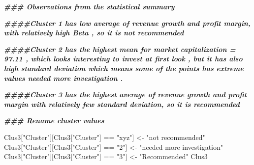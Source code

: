 \documentclass[
]{article}
\newenvironment{Shaded}{\begin{snugshade}}{\end{snugshade}}
\newcommand{\DocumentationTok}[1]{\textcolor[rgb]{0.56,0.35,0.01}{\textbf{\textit{#1}}}}
\newcommand{\NormalTok}[1]{#1}
\newcommand{\OtherTok}[1]{\textcolor[rgb]{0.56,0.35,0.01}{#1}}
\newcommand{\SpecialCharTok}[1]{\textcolor[rgb]{0.00,0.00,0.00}{#1}}
\newcommand{\StringTok}[1]{\textcolor[rgb]{0.31,0.60,0.02}{#1}}
\begin{document}
\begin{Shaded}
\begin{Highlighting}[]
\DocumentationTok{\#\#\#  Observations from the statistical summary }

\DocumentationTok{\#\#\#\#Cluster 1 has low average of revenue growth and profit margin, with relatively high Beta , so it is not recommended}

\DocumentationTok{\#\#\#\#Cluster 2  has the highest mean for market capitalization = 97.11 , which looks interesting to invest at first look , but it has also high standard deviation which means some of the points has extreme values needed more investigation  . }

\DocumentationTok{\#\#\#\#Cluster 3 has the highest average of revenue growth and profit margin with relatively few standard deviation, so it is recommended}
\end{Highlighting}
\end{Shaded}

\begin{Shaded}
\begin{Highlighting}[]
\DocumentationTok{\#\#\# Rename cluster values  }

\NormalTok{Clus3[}\StringTok{"Cluster"}\NormalTok{][Clus3[}\StringTok{"Cluster"}\NormalTok{] }\SpecialCharTok{==} \StringTok{"xyz"}\NormalTok{] }\OtherTok{\textless{}{-}} \StringTok{"not recommended"}
\NormalTok{Clus3[}\StringTok{"Cluster"}\NormalTok{][Clus3[}\StringTok{"Cluster"}\NormalTok{] }\SpecialCharTok{==} \StringTok{"2"}\NormalTok{] }\OtherTok{\textless{}{-}} \StringTok{"needed more investigation"}
\NormalTok{Clus3[}\StringTok{"Cluster"}\NormalTok{][Clus3[}\StringTok{"Cluster"}\NormalTok{] }\SpecialCharTok{==} \StringTok{"3"}\NormalTok{] }\OtherTok{\textless{}{-}} \StringTok{"Recommended"}
\NormalTok{Clus3}
\end{Highlighting}
\end{Shaded}
\end{document}
